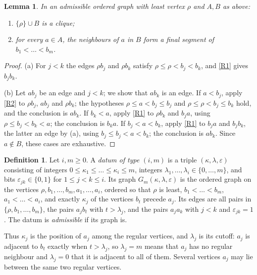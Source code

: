 \documentclass[11pt]{amsart}
\newtheorem{lemma}[theorem]{Lemma}
\theoremstyle{definition}
\newtheorem{definition}[theorem]{Definition}
\theoremstyle{remark}
\numberwithin{equation}{section}
\begin{document}
\begin{lemma}\label{lem:segments}
In an admissible ordered graph with least vertex $\rho$ and $A,B$ as above:
\begin{enumerate}[label=\textup{(\alph*)}]
\item $\{\rho\}\cup B$ is a clique;
\item for every $a\in A$, the neighbours of $a$ in $B$ form a final segment of $b_1<\dots<b_m$.
\end{enumerate}
\end{lemma}

\begin{proof}
(a) For $j<k$ the edges $\rho b_j$ and $\rho b_k$ satisfy $\rho\le\rho<b_j<b_k$, and \ref{R1} gives $b_jb_k$.

(b) Let $ab_j$ be an edge and $j<k$; we show that $ab_k$ is an edge. If $a<b_j$, apply \ref{R2} to $\rho b_j$, $ab_j$ and $\rho b_k$; the hypotheses $\rho\le a<b_j\le b_j$ and $\rho\le\rho<b_j\le b_k$ hold, and the conclusion is $ab_k$. If $b_k<a$, apply \ref{R1} to $\rho b_k$ and $b_ja$, using $\rho\le b_j<b_k<a$; the conclusion is $b_ka$. If $b_j<a<b_k$, apply \ref{R1} to $b_ja$ and $b_jb_k$, the latter an edge by (a), using $b_j\le b_j<a<b_k$; the conclusion is $ab_k$. Since $a\notin B$, these cases are exhaustive.
\end{proof}

\begin{definition}\label{def:data}
Let $i,m\ge0$. A \emph{datum of type $(i,m)$} is a triple $(\kappa,\lambda,\varepsilon)$ consisting of integers $0\le\kappa_1\le\dots\le\kappa_i\le m$, integers $\lambda_1,\dots,\lambda_i\in\{0,\dots,m\}$, and bits $\varepsilon_{jk}\in\{0,1\}$ for $1\le j<k\le i$. Its graph $G_m(\kappa,\lambda,\varepsilon)$ is the ordered graph on the vertices $\rho,b_1,\dots,b_m,a_1,\dots,a_i$, ordered so that $\rho$ is least, $b_1<\dots<b_m$, $a_1<\dots<a_i$, and exactly $\kappa_j$ of the vertices $b_t$ precede $a_j$. Its edges are all pairs in $\{\rho,b_1,\dots,b_m\}$, the pairs $a_jb_t$ with $t>\lambda_j$, and the pairs $a_ja_k$ with $j<k$ and $\varepsilon_{jk}=1$. The datum is \emph{admissible} if its graph is.
\end{definition}

Thus $\kappa_j$ is the position of $a_j$ among the regular vertices, and $\lambda_j$ is its cutoff: $a_j$ is adjacent to $b_t$ exactly when $t>\lambda_j$, so $\lambda_j=m$ means that $a_j$ has no regular neighbour and $\lambda_j=0$ that it is adjacent to all of them. Several vertices $a_j$ may lie between the same two regular vertices.
\end{document}
